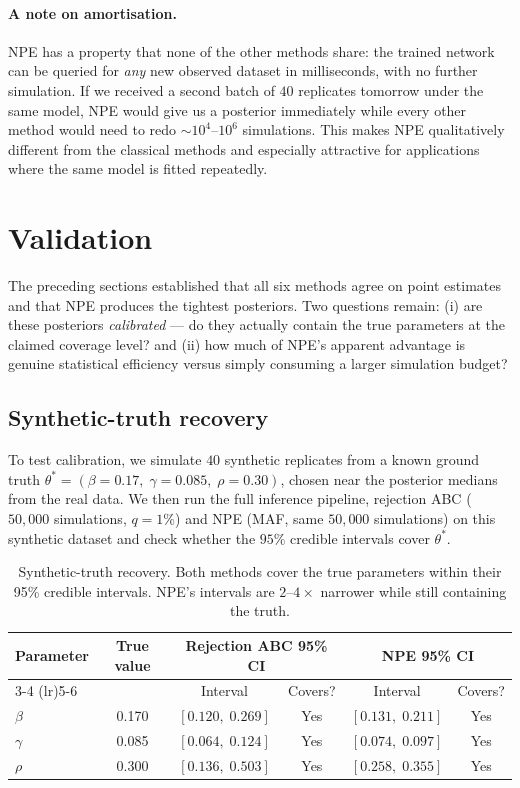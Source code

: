 \documentclass[11pt]{article}
\begin{document}
\paragraph{A note on amortisation.} NPE has a property that none of the other methods share: the trained network can be queried for \emph{any} new observed dataset in milliseconds, with no further simulation. If we received a second batch of $40$ replicates tomorrow under the same model, NPE would give us a posterior immediately while every other method would need to redo $\sim 10^4$--$10^6$ simulations. This makes NPE qualitatively different from the classical methods and especially attractive for applications where the same model is fitted repeatedly.

\section{Validation}

The preceding sections established that all six methods agree on point estimates and that NPE produces the tightest posteriors. Two questions remain: (i) are these posteriors \emph{calibrated} --- do they actually contain the true parameters at the claimed coverage level? and (ii) how much of NPE's apparent advantage is genuine statistical efficiency versus simply consuming a larger simulation budget?

\subsection{Synthetic-truth recovery}

To test calibration, we simulate $40$ synthetic replicates from a known ground truth $\theta^* = (\beta = 0.17,\; \gamma = 0.085,\; \rho = 0.30)$, chosen near the posterior medians from the real data. We then run the full inference pipeline, rejection ABC ($50{,}000$ simulations, $q=1\%$) and NPE (MAF, same $50{,}000$ simulations) on this synthetic dataset and check whether the $95\%$ credible intervals cover $\theta^*$.

\begin{table}[H]
\centering
\small
\begin{tabular}{lccccc}
\toprule
Parameter & True value & \multicolumn{2}{c}{Rejection ABC 95\% CI} & \multicolumn{2}{c}{NPE 95\% CI} \\
\cmidrule(lr){3-4} \cmidrule(lr){5-6}
 & & Interval & Covers? & Interval & Covers? \\
\midrule
$\beta$  & 0.170 & $[0.120,\; 0.269]$ & Yes & $[0.131,\; 0.211]$ & Yes \\
$\gamma$ & 0.085 & $[0.064,\; 0.124]$ & Yes & $[0.074,\; 0.097]$ & Yes \\
$\rho$   & 0.300 & $[0.136,\; 0.503]$ & Yes & $[0.258,\; 0.355]$ & Yes \\
\bottomrule
\end{tabular}
\caption{Synthetic-truth recovery. Both methods cover the true parameters within their 95\% credible intervals. NPE's intervals are $2$--$4\times$ narrower while still containing the truth.}
\label{tab:synthetic_truth}
\end{table}
\end{document}
